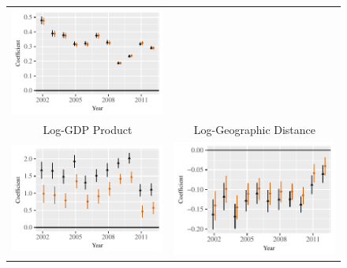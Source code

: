 \documentclass{article}
\begin{document}
\begin{figure}[htp]
\begin{tabular}{c@{\hskip -.4cm}c}
\includegraphics[height=.22\textheight, clip=true, trim=.5cm .5cm 0cm .1cm]{draft_figures/rl_plots/LDV.pdf}   \\
Log-GDP Product &
Log-Geographic Distance\\
\includegraphics[height=.22\textheight, clip=true, trim=0cm .5cm 0cm .1cm]{draft_figures/rl_plots/Mass.pdf}    &
\includegraphics[height=.22\textheight, clip=true, trim=.5cm .5cm 0cm .1cm]{draft_figures/rl_plots/Distance.pdf}   \\

\end{tabular}
\end{figure}
\end{document}
